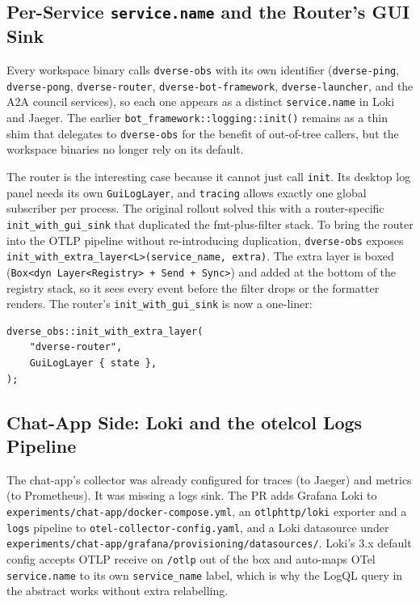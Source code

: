 \documentclass[11pt,a4paper]{article}
\begin{document}
\subsection{Per-Service \texttt{service.name} and the Router's GUI Sink}

Every workspace binary calls \texttt{dverse-obs} with its own
identifier (\texttt{dverse-ping}, \texttt{dverse-pong},
\texttt{dverse-router}, \texttt{dverse-bot-framework},
\texttt{dverse-launcher}, and the A2A council services), so each
one appears as a distinct \texttt{service.name} in Loki and
Jaeger. The earlier \texttt{bot\_framework::logging::init()}
remains as a thin shim that delegates to \texttt{dverse-obs} for
the benefit of out-of-tree callers, but the workspace binaries
no longer rely on its default.

The router is the interesting case because it cannot just call
\texttt{init}. Its desktop log panel needs its own
\texttt{GuiLogLayer}, and \texttt{tracing} allows exactly one
global subscriber per process. The original rollout solved this
with a router-specific \texttt{init\_with\_gui\_sink} that
duplicated the fmt-plus-filter stack. To bring the router into
the OTLP pipeline without re-introducing duplication,
\texttt{dverse-obs} exposes
\texttt{init\_with\_extra\_layer<L>(service\_name, extra)}. The
extra layer is boxed
(\texttt{Box<dyn Layer<Registry> + Send + Sync>}) and added at
the bottom of the registry stack, so it sees every event before
the filter drops or the formatter renders. The router's
\texttt{init\_with\_gui\_sink} is now a one-liner:

\begin{lstlisting}
dverse_obs::init_with_extra_layer(
    "dverse-router",
    GuiLogLayer { state },
);
\end{lstlisting}

\subsection{Chat-App Side: Loki and the otelcol Logs Pipeline}

The chat-app's collector was already configured for traces (to
Jaeger) and metrics (to Prometheus). It was missing a logs sink.
The PR adds Grafana Loki to
\texttt{experiments/chat-app/docker-compose.yml}, an
\texttt{otlphttp/loki} exporter and a \texttt{logs} pipeline to
\texttt{otel-collector-config.yaml}, and a Loki
datasource under
\texttt{experiments/chat-app/grafana/provisioning/datasources/}.
Loki's 3.x default config accepts OTLP receive on
\texttt{/otlp} out of the box and auto-maps OTel
\texttt{service.name} to its own \texttt{service\_name} label,
which is why the LogQL query in the abstract works without
extra relabelling.
\end{document}
